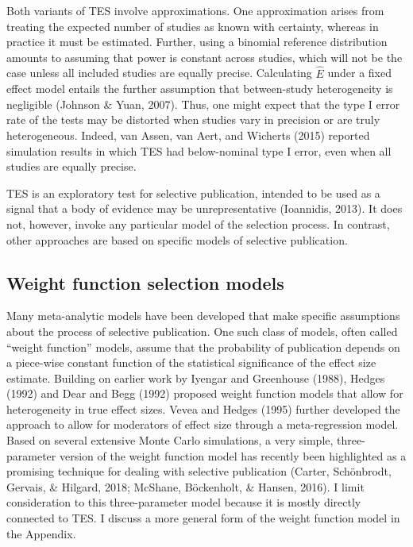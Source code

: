 \documentclass[man,floatsintext]{apa6}
\begin{document}
Both variants of TES involve approximations. One approximation arises from treating the expected number of studies as known with certainty, whereas in practice it must be estimated. Further, using a binomial reference distribution amounts to assuming that power is constant across studies, which will not be the case unless all included studies are equally precise.
Calculating \(\hat{E}\) under a fixed effect model entails the further assumption that between-study heterogeneity is negligible (Johnson \& Yuan, 2007).
Thus, one might expect that the type I error rate of the tests may be distorted when studies vary in precision or are truly heterogeneous.
Indeed, van Assen, van Aert, and Wicherts (2015) reported simulation results in which TES had below-nominal type I error, even when all studies are equally precise.

TES is an exploratory test for selective publication, intended to be used as a signal that a body of evidence may be unrepresentative (Ioannidis, 2013). It does not, however, invoke any particular model of the selection process. In contrast, other approaches are based on specific models of selective publication.

\hypertarget{weight-function-selection-models}{%
\subsection{Weight function selection models}\label{weight-function-selection-models}}

Many meta-analytic models have been developed that make specific assumptions about the process of selective publication.
One such class of models, often called \enquote{weight function} models, assume that the probability of publication depends on a piece-wise constant function of the statistical significance of the effect size estimate.
Building on earlier work by Iyengar and Greenhouse (1988), Hedges (1992) and Dear and Begg (1992) proposed weight function models that allow for heterogeneity in true effect sizes.
Vevea and Hedges (1995) further developed the approach to allow for moderators of effect size through a meta-regression model.
Based on several extensive Monte Carlo simulations, a very simple, three-parameter version of the weight function model has recently been highlighted as a promising technique for dealing with selective publication (Carter, Schönbrodt, Gervais, \& Hilgard, 2018; McShane, Böckenholt, \& Hansen, 2016).
I limit consideration to this three-parameter model because it is mostly directly connected to TES.
I discuss a more general form of the weight function model in the Appendix.
\end{document}
